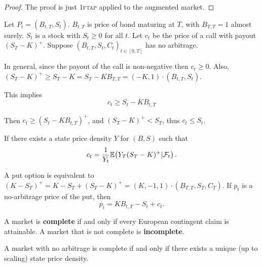 \begin{proof}
  The proof is just \textsc{1ftap} applied to the augmented market.
\end{proof}

\begin{exmp}
  \label{defn:discrete_time_models:24}
  Let $P_{t} = (B_{t, T}, S_{t})$.  $B_{t, T}$ is price of bond
  maturing at $T$, with $B_{T, T} = 1$ almost surely.  $S_{t}$ is a
  stock with $S_{t} \geq 0$ for all $t$.  Let $c_{t}$ be the price of
  a call with payout $(S_{T} - K)^{+}$.  Suppose $(B_{t, T}, S_{t},
  C_{t})_{t \in [0, T]}$ has no arbitrage.

  In general, since the payout of the call is non-negative then $c_{t}
  \geq 0$.  Also, $(S_{T} - K)^{+} \geq S_{T} - K = S_{T} - K B_{T, T}
  = (-K, 1) \cdot (B_{t, T}, S_{t})$.

  This implies
  \begin{equation}
    \label{eq:23}
    c_{t} \geq S_{t} - K B_{t, T}
  \end{equation}

  Then $c_{t} \geq (S_{t} - KB_{t, T})^{+}$, and $(S_{T} - K)^{+} <
  S_{T}$, thus $c_{t} \leq S_{t}$.

  If there exists a state price density $Y$ for $(B, S)$ such that
  \begin{align}
    \label{eq:152}
    c_{t} = \frac{1}{Y_{t}} \E{Y_{T}(S_{T} - K)^{+} |
      \mathcal{F}_{t}}.
  \end{align}
\end{exmp}

\begin{exmp}
  \label{defn:discrete_time_models:25}
  A put option is equivalent to $(K - S_{T})^{+} = K - S_{T} + (S_{T}
  - K)^{+} = (K, -1, 1) \cdot (B_{T, T}, S_{T}, C_{T})$.  If $p_{t}$
  is a no-arbitrage price of the put, then
  \begin{equation}
    \label{eq:24}
    p_{t} = K B_{t, T} - S_{t} + c_{t}.
  \end{equation}
\end{exmp}

\begin{defn}
  \label{defn:discrete_time_models:26}
  A market is \textbf{complete} if and only if every European
  contingent claim is attainable. A market that is not complete is
  \textbf{incomplete}.
\end{defn}

\begin{thm}
  \label{defn:discrete_time_models:27}
  A market with no arbitrage is complete if and only if there exists a
  unique (up to scaling) state price density.
\end{thm}

